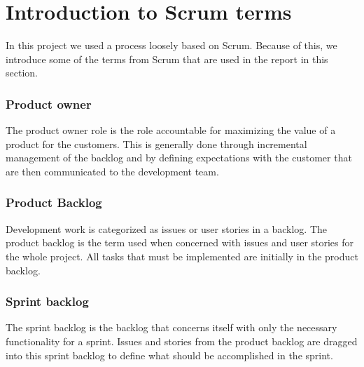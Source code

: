 \section{Introduction to Scrum terms}\label{sec:scrum_terms}
In this project we used a process loosely based on Scrum.
Because of this, we introduce some of the terms from Scrum that are used in the report in this section.

\subsubsection{Product owner}
The product owner role is the role accountable for maximizing the value of a product for the customers.
This is generally done through incremental management of the backlog and by defining expectations with the customer that are then communicated to the development team.

\subsubsection{Product Backlog}
Development work is categorized as issues or user stories in a backlog.
The product backlog is the term used when concerned with issues and user stories for the whole project.
All tasks that must be implemented are initially in the product backlog. 

\subsubsection{Sprint backlog}
The sprint backlog is the backlog that concerns itself with only the necessary functionality for a sprint.
Issues and stories from the product backlog are dragged into this sprint backlog to define what should be accomplished in the sprint. 
